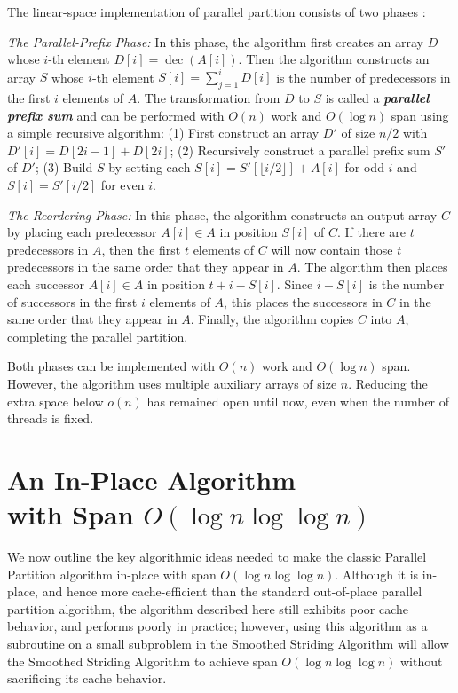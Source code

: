 \documentclass[sigconf, 10pt, nonacm]{acmart}
\newcommand{\dec}{\operatorname{dec}}
\newcommand{\defn}[1]{{\textit{\textbf{\boldmath #1}}}}
\renewcommand{\paragraph}[1]{\vspace{0.09in}\noindent{\bf \boldmath #1.}}
\theoremstyle{remark}
\theoremstyle{remark}
\begin{document}
\paragraph{The (Standard) Linear-Space Parallel Partition} The linear-space
implementation of parallel partition consists of two phases
\cite{Blelloch96,AcarBl16}:

\noindent\emph{The Parallel-Prefix Phase: }In this phase, the algorithm first
creates an array $D$ whose $i$-th element $D[i] = \dec(A[i])$. Then the
algorithm constructs an array $S$ whose $i$-th element $S[i] = \sum_{j = 1}^i
D[i]$ is the number of predecessors in the first $i$ elements of $A$. The
transformation from $D$ to $S$ is called a \defn{parallel prefix sum} and can
be performed with $O(n)$ work and $O(\log n)$ span using a simple recursive
algorithm: (1) First construct an array $D'$ of size $n / 2$ with $D'[i] = D[2i
- 1] + D[2i]$; (2) Recursively construct a parallel prefix sum $S'$ of $D'$;
(3) Build $S$ by setting each $S[i] = S'[\lfloor i / 2 \rfloor] + A[i]$ for odd
$i$ and $S[i] = S'[i / 2]$ for even $i$. 

\noindent\emph{The Reordering Phase: }In this phase, the algorithm constructs
an output-array $C$ by placing each predecessor $A[i] \in A$ in position $S[i]$
of $C$. If there are $t$ predecessors in $A$, then the first $t$ elements of
$C$ will now contain those $t$ predecessors in the same order that they appear
in $A$. The algorithm then places each successor $A[i] \in A$ in position $t +
i - S[i]$. Since $i - S[i]$ is the number of successors in the first $i$
elements of $A$, this places the successors in $C$ in the same order that they
appear in $A$. Finally, the algorithm copies $C$ into $A$, completing the
parallel partition.

Both phases can be implemented with $O(n)$ work and $O(\log n)$
span. However, the algorithm uses multiple auxiliary arrays of size $n$.
Reducing the extra space below $o(n)$ has remained open until now, even when
the number of threads is fixed.

\section{An In-Place Algorithm \\with Span $O(\log n \log \log
n)$}\label{sec:prefixbasedalg} We now outline the key algorithmic ideas needed
to make the classic Parallel Partition algorithm in-place with span $O(\log n
\log \log n)$. Although it is in-place, and hence more cache-efficient than the
standard out-of-place parallel partition algorithm, the algorithm described
here still exhibits poor cache behavior, and performs poorly in practice;
however, using this algorithm as a subroutine on a small subproblem in the
Smoothed Striding Algorithm will allow the Smoothed Striding Algorithm to
achieve span $O(\log n \log \log n)$ without sacrificing its cache behavior.
\end{document}
